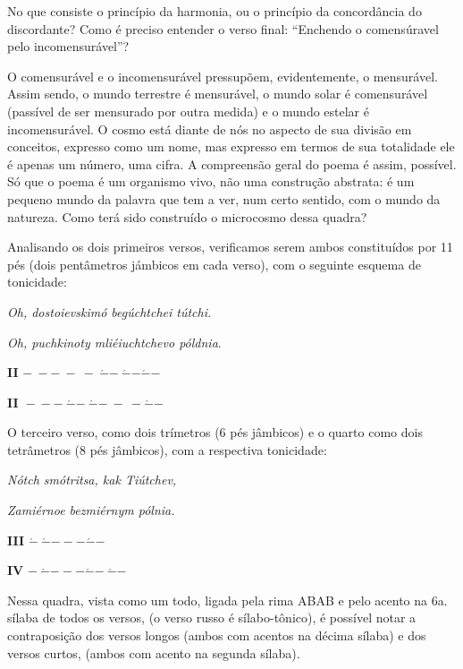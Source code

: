 No que consiste o princípio da harmonia, ou o princípio da concordância
do discordante? Como é preciso entender o verso final: ``Enchendo o
comensúravel pelo incomensurável''?

O comensurável e o incomensurável pressupõem, evidentemente, o
mensurável. Assim sendo, o mundo terrestre é mensurável, o mundo solar é
comensurável (passível de ser mensurado por outra medida) e o mundo
estelar é incomensurável. O cosmo está diante de nós no aspecto de sua
divisão em conceitos, expresso como um nome, mas expresso em termos de
sua totalidade ele é apenas um número, uma cifra. A compreensão geral do
poema é assim, possível. Só que o poema é um organismo vivo, não uma
construção abstrata: é um pequeno mundo da palavra que tem a ver, num
certo sentido, com o mundo da natureza. Como terá sido construído o
microcosmo dessa quadra?

Analisando os dois primeiros versos, verificamos serem ambos
constituídos por 11 pés (dois pentâmetros jámbicos em cada verso), com o
seguinte esquema de tonicidade:

\emph{Oh, dostoievskimó begúchtchei tútchi.}

\emph{Oh, puchkinoty mliéiuchtchevo póldnia}.

\textbf{II}
\(\mathbf{- \  - - \  - \  - \ }\acute{\mathbf{-}}\mathbf{- \ }\acute{\mathbf{-}}\mathbf{-}\acute{\mathbf{-}}\mathbf{-}\)

\textbf{II~}\(\mathbf{- \  - - \ }\acute{\mathbf{-}}\mathbf{- \ }\acute{\mathbf{-}}\mathbf{- \  - \  -}\acute{\mathbf{-}}\mathbf{-}\)

O terceiro verso, como dois trímetros (6 pés jâmbicos) e o quarto como
dois tetrâmetros (8 pés jâmbicos), com a respectiva tonicidade:

\emph{Nótch smótritsa, kak Tiútchev,}

\emph{Zamiérnoe bezmiérnym pólnia.}

\textbf{III}
\(\acute{\mathbf{-}}\mathbf{\ }\acute{\mathbf{-}}\mathbf{- - -}\acute{\mathbf{-}}\mathbf{- \ }\)

\textbf{IV}
\(\mathbf{- \ }\acute{\mathbf{-}}\mathbf{- - -}\acute{\mathbf{-}}\mathbf{- \ }\acute{\mathbf{-}}\mathbf{- \ }\)\textbf{\\
}

Nessa quadra, vista como um todo, ligada pela rima ABAB e pelo acento na
6a. sílaba de todos os versos, (o verso russo é sílabo-tônico), é
possível notar a contraposição dos versos longos (ambos com acentos na
décima sílaba) e dos versos curtos, (ambos com acento na segunda
sílaba).

